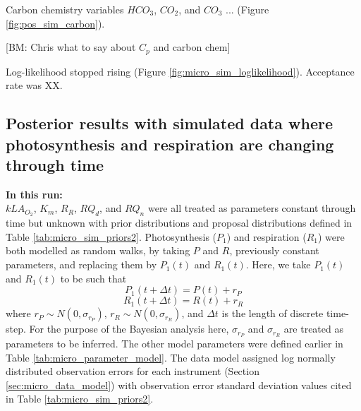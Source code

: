 \documentclass{ruthesis}
\begin{document}
Carbon chemistry variables $HCO_3$, $CO_2$, and $CO_3$ ... (Figure \ref{fig:pos_sim_carbon}).

[BM: Chris what to say about $C_p$ and carbon chem]

Log-likelihood stopped rising (Figure \ref{fig:micro_sim_loglikelihood}).
Acceptance rate was XX.

\FloatBarrier
\subsection{Posterior results with simulated data where photosynthesis and respiration are changing through time}\label{sec:micro_sim_results2}

\textbf{In this run:}\\
$kLA_{O_2}$, $K_m$, $R_R$, $RQ_d$, and $RQ_n$ were all treated as parameters constant through time but unknown with prior distributions and proposal distributions defined in Table \ref{tab:micro_sim_priors2}.
Photosynthesis ($P_1$) and respiration ($R_1$) were both modelled as random walks, by taking \begin{math}P\end{math} and \begin{math}R\end{math}, previously constant parameters, and replacing them by \begin{math}P_1(t)\end{math} and \begin{math}R_1(t)\end{math}. Here, we take \begin{math}P_1(t)\end{math} and \begin{math}R_1(t)\end{math} to be such that
\begin{displaymath}
P_1(t+\Delta t) = P(t) + r_P
\end{displaymath}
\begin{displaymath}
R_1(t+\Delta t) = R(t) + r_R
\end{displaymath}
where \begin{math}
r_P \sim N(0, \sigma_{r_P})
\end{math}, \begin{math}
r_R \sim N(0, \sigma_{r_R})
\end{math}, and \begin{math}
\Delta t
\end{math} is the length of discrete time-step. For the purpose of the Bayesian analysis here, \begin{math}\sigma_{r_P}\end{math} and \begin{math}\sigma_{r_R}\end{math} are treated as parameters to be inferred. 
The other model parameters were defined earlier in Table \ref{tab:micro_parameter_model}.
The data model assigned log normally distributed observation errors for each instrument (Section \ref{sec:micro_data_model}) with observation error standard deviation values cited in Table \ref{tab:micro_sim_priors2}.
\end{document}
